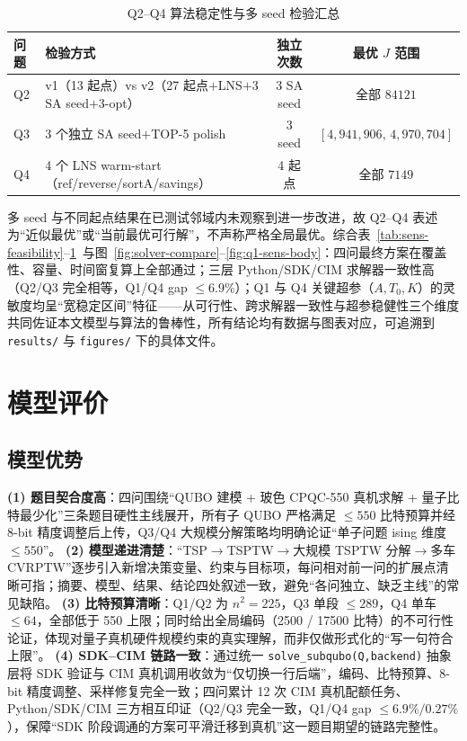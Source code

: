 \documentclass[UTF8,12pt,a4paper]{ctexart}
\begin{document}
\begin{table}[H]
    \centering\footnotesize
    \caption{Q2--Q4 算法稳定性与多 seed 检验汇总}
    \label{tab:sens-stability}
    \begin{tabular}{lp{6.4cm}cc}
        \toprule
        问题 & 检验方式 & 独立次数 & 最优 $J$ 范围 \\
        \midrule
        Q2 & v1（13 起点）vs v2（27 起点$+$LNS$+$3 SA seed$+$3-opt） & 3 SA seed & 全部 $84121$ \\
        Q3 & 3 个独立 SA seed$+$TOP-5 polish & 3 seed & $[4{,}941{,}906,\,4{,}970{,}704]$ \\
        Q4 & 4 个 LNS warm-start（ref/reverse/sortA/savings）& 4 起点 & 全部 $7149$ \\
        \bottomrule
    \end{tabular}
\end{table}

多 seed 与不同起点结果在已测试邻域内未观察到进一步改进，故 Q2--Q4 表述为``近似最优''或``当前最优可行解''，不声称严格全局最优。综合表~\ref{tab:sens-feasibility}--\ref{tab:sens-stability}~与图~\ref{fig:solver-compare}--\ref{fig:q1-sens-body}：四问最终方案在覆盖性、容量、时间窗复算上全部通过；三层 Python/SDK/CIM 求解器一致性高（Q2/Q3 完全相等，Q1/Q4 gap $\le 6.9\%$）；Q1 与 Q4 关键超参（$A,T_0,K$）的灵敏度均呈``宽稳定区间''特征——从可行性、跨求解器一致性与超参稳健性三个维度共同佐证本文模型与算法的鲁棒性，所有结论均有数据与图表对应，可追溯到 \texttt{results/} 与 \texttt{figures/} 下的具体文件。

\section{模型评价}

\subsection{模型优势}

\textbf{(1) 题目契合度高}：四问围绕``QUBO 建模 + 玻色 CPQC-550 真机求解 + 量子比特最少化''三条题目硬性主线展开，所有子 QUBO 严格满足 $\le 550$ 比特预算并经 8-bit 精度调整后上传，Q3/Q4 大规模分解策略均明确论证``单子问题 ising 维度 $\le 550$''。
\textbf{(2) 模型递进清楚}：``TSP$\to$TSPTW$\to$大规模 TSPTW 分解$\to$多车 CVRPTW''逐步引入新增决策变量、约束与目标项，每问相对前一问的扩展点清晰可指；摘要、模型、结果、结论四处叙述一致，避免``各问独立、缺乏主线''的常见缺陷。
\textbf{(3) 比特预算清晰}：Q1/Q2 为 $n^{2}=225$，Q3 单段 $\le 289$，Q4 单车 $\le 64$，全部低于 550 上限；同时给出全局编码（2500 / 17500 比特）的不可行性论证，体现对量子真机硬件规模约束的真实理解，而非仅做形式化的``写一句符合上限''。
\textbf{(4) SDK--CIM 链路一致}：通过统一 \texttt{solve\_subqubo(Q,backend)} 抽象层将 SDK 验证与 CIM 真机调用收敛为``仅切换一行后端''，编码、比特预算、8-bit 精度调整、采样修复完全一致；四问累计 12 次 CIM 真机配额任务、Python/SDK/CIM 三方相互印证（Q2/Q3 完全一致，Q1/Q4 gap $\le 6.9\%/0.27\%$），保障``SDK 阶段调通的方案可平滑迁移到真机''这一题目期望的链路完整性。
\end{document}
